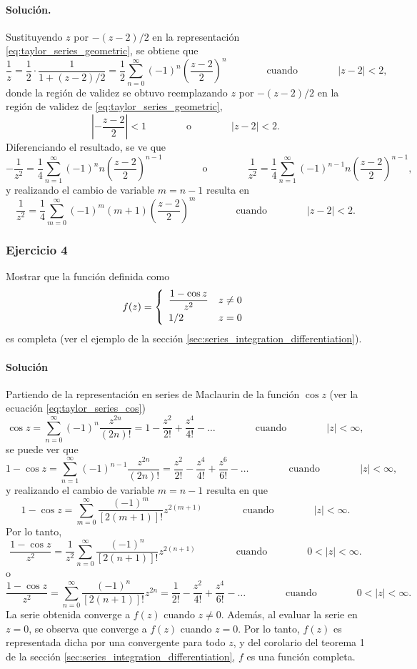 \documentclass[a4paper]{report}
\begin{document}
\paragraph{Solución.} Sustituyendo \(z\) por \(-(z-2)/2\) en la representación \ref{eq:taylor_series_geometric}, se obtiene que 
\[
 \frac{1}{z}=\frac{1}{2}\cdot\frac{1}{1+(z-2)/2}=\frac{1}{2}\sum_{n=0}^\infty(-1)^n\left(\frac{z-2}{2}\right)^n
 \qquad\qquad\textrm{cuando}\qquad\qquad
 |z-2|<2,
\]
donde la región de validez se obtuvo reemplazando \(z\) por \(-(z-2)/2\) en la región de validez de \ref{eq:taylor_series_geometric},
\[
 \left|-\frac{z-2}{2}\right|<1
 \qquad\qquad\textrm{o}\qquad\qquad
 |z-2|<2.
\]
Diferenciando el resultado, se ve que
\[
 -\frac{1}{z^2}=\frac{1}{4}\sum_{n=1}^\infty(-1)^nn\left(\frac{z-2}{2}\right)^{n-1}
 \qquad\qquad\textrm{o}\qquad\qquad
 \frac{1}{z^2}=\frac{1}{4}\sum_{n=1}^\infty(-1)^{n-1}n\left(\frac{z-2}{2}\right)^{n-1},
\]
y realizando el cambio de variable \(m=n-1\) resulta en 
\[
 \frac{1}{z^2}=\frac{1}{4}\sum_{m=0}^\infty(-1)^m(m+1)\left(\frac{z-2}{2}\right)^m
 \qquad\qquad\textrm{cuando}\qquad\qquad
 |z-2|<2. 
\]

\subsubsection*{Ejercicio 4}

Mostrar que la función definida como
\[
 f(z)=
 \left\{ 
 \begin{array}{ll}
  \dfrac{1-\cos z}{z^2} & z\neq0\\[\medskipamount]
  1/2 & z=0
 \end{array}
 \right.
\]
es completa (ver el ejemplo de la sección \ref{sec:series_integration_differentiation}).

\paragraph{Solución} Partiendo de la representación en series de Maclaurin de la función \(\cos z\) (ver la ecuación \ref{eq:taylor_series_cos})
\[
 \cos z=\sum_{n=0}^\infty(-1)^n\frac{z^{2n}}{(2n)!}=1-\frac{z^2}{2!}+\frac{z^4}{4!}-\dots
 \qquad\qquad\textrm{cuando}\qquad\qquad
 |z|<\infty,
\]
se puede ver que 
\[
 1-\cos z=\sum_{n=1}^\infty(-1)^{n-1}\frac{z^{2n}}{(2n)!}=\frac{z^2}{2!}-\frac{z^4}{4!}+\frac{z^6}{6!}-\dots
 \qquad\qquad\textrm{cuando}\qquad\qquad
 |z|<\infty,
\]
y realizando el cambio de variable \(m=n-1\) resulta en que 
\[
 1-\cos z=\sum_{m=0}^\infty\frac{(-1)^m}{[2(m+1)]!}z^{2(m+1)}
 \qquad\qquad\textrm{cuando}\qquad\qquad
 |z|<\infty.
\]
Por lo tanto,
\[
 \frac{1-\cos z}{z^2}=\frac{1}{z^2}\sum_{n=0}^\infty\frac{(-1)^n}{[2(n+1)]!}z^{2(n+1)}
 \qquad\qquad\textrm{cuando}\qquad\qquad
 0<|z|<\infty.
\]
o 
\[
 \frac{1-\cos z}{z^2}=\sum_{n=0}^\infty\frac{(-1)^n}{[2(n+1)]!}z^{2n}
 =\frac{1}{2!}-\frac{z^2}{4!}+\frac{z^4}{6!}-\dots
 \qquad\qquad\textrm{cuando}\qquad\qquad
 0<|z|<\infty.
\] 
La serie obtenida converge a \(f(z)\) cuando \(z\neq0\). Además, al evaluar la serie en \(z=0\), se observa que converge a \(f(z)\) cuando \(z=0\). Por lo tanto, \(f(z)\) es representada dicha por una convergente para todo \(z\), y del corolario del teorema 1 de la sección \ref{sec:series_integration_differentiation}, \(f\) es una función completa.
 
\end{document}
